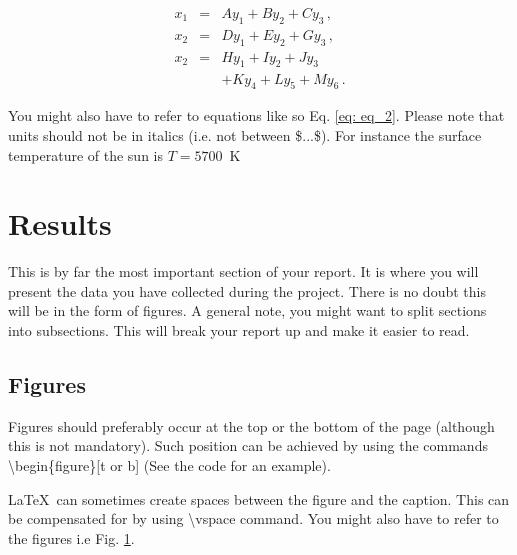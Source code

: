 \documentclass[a4paper, onecolumn, 12pt, notitlepage]{revtex4-1}
\begin{document}
\begin{eqnarray}
x_1 &=& A y_1 + B y_2 + C y_3    \,, \\
x_2 &=& D y_1 + E y_2 + G y_3    \,, \\ 
x_2 &=& H y_1 + I y_2 + J y_3    \nonumber\\
    &~& + K y_4 + L y_5 + M y_6  \,. 
\label{eq: eq_2}
\end{eqnarray}

You might also have to refer to equations like so Eq. \eqref{eq: eq_2}. Please note that units should not be in italics (i.e. not between \$...\$). For instance the surface temperature of the sun is $T = 5700$~K


\section{Results}
This is by far the most important section of your report. It is where you will present the data you have collected during the project. There is no doubt this will be in the form of figures. A general note, you might want to split sections into subsections. This will break your report up and make it easier to read.

\begin{figure*}[t]
\centering

\caption{\small This is just an example for a wide figure.
                If you want to use *.jpg or *.pdf files
                for your figures, you need to compile with
                ``pdflatex''.}
\label{fig: fig_2}
\end{figure*}

\subsection{Figures}
Figures should preferably occur at the top or the bottom of the page (although this is not mandatory). Such position can be achieved by using the commands \textbackslash begin\{figure\}[t or b] (See the code for an example).  

\begin{figure}[b]
\centering

\label{fig: fig_1}
\end{figure}

\LaTeX\ can sometimes create spaces between the figure and the caption. This can be compensated for by using \textbackslash vspace command. You might also have to refer to the figures i.e Fig. \ref{fig: fig_1}.
\end{document}
